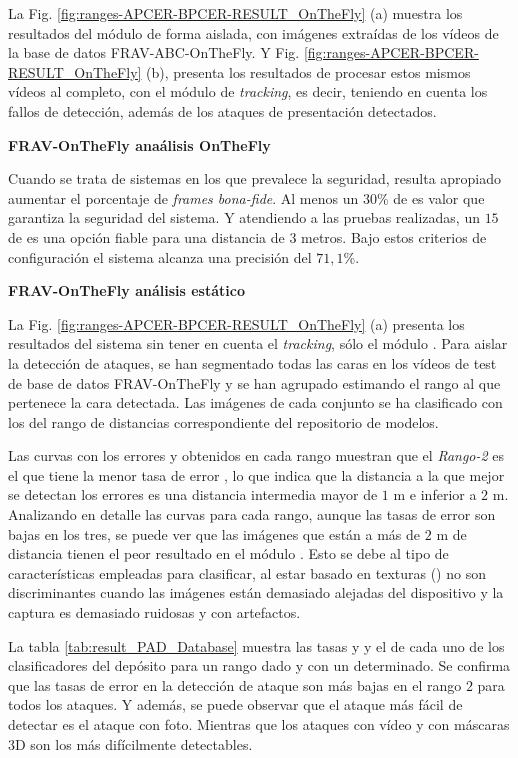 La Fig. \ref{fig:ranges-APCER-BPCER-RESULT_OnTheFly} (a) muestra los resultados del módulo  de forma aislada, con imágenes extraídas de los vídeos de la base de datos \Gls{FRAV-ABC-OnTheFly}. Y Fig. \ref{fig:ranges-APCER-BPCER-RESULT_OnTheFly} (b), presenta los resultados de procesar estos mismos vídeos al completo, con el módulo de \textit{tracking}, es decir, teniendo en cuenta los fallos de detección, además de los ataques de presentación detectados.

\medskip
\textbf{\Gls{FRAV-OnTheFly} anaálisis \gls{OnTheFly}} %
\medskip

Cuando se trata de sistemas  en los que prevalece la seguridad, resulta apropiado aumentar el porcentaje de \textit{frames bona-fide}. Al menos un $30$\% de  es valor que garantiza la seguridad del sistema. Y atendiendo a las pruebas realizadas, un $15$ de  es una opción fiable para una distancia de $3$ metros. Bajo estos criterios de configuración el sistema alcanza una precisión del $71,1$\%.


\medskip
\textbf{\Gls{FRAV-OnTheFly} análisis estático} %
\medskip

La Fig. \ref{fig:ranges-APCER-BPCER-RESULT_OnTheFly} (a) presenta los resultados del sistema sin tener en cuenta el \textit{tracking}, sólo el módulo . Para aislar la detección de ataques, se han segmentado todas las caras en los vídeos de test de base de datos \Gls{FRAV-OnTheFly} y se han agrupado estimando el rango al que pertenece la cara detectada. Las imágenes de cada conjunto se ha clasificado con los  del rango de distancias correspondiente del repositorio de modelos.

Las curvas  con los errores  y  obtenidos en cada rango muestran que el \textit{Rango-2} es el que tiene la menor tasa de error , lo que indica que la distancia a la que mejor se detectan los errores es una distancia intermedia mayor de $1$ m e inferior a $2$ m. Analizando en detalle las curvas para cada rango, aunque las tasas de error son bajas en los tres, se puede ver que las imágenes que están a más de $2$ m de distancia tienen el peor resultado en el módulo . Esto se debe al tipo de características empleadas para clasificar, al estar basado en texturas () no son discriminantes cuando las imágenes están demasiado alejadas del dispositivo y la captura es demasiado ruidosas y con artefactos.

La tabla \ref{tab:result_PAD_Database} muestra las tasas  y  y el  de cada uno de los clasificadores del depósito para un rango dado y con un  determinado. Se confirma que las tasas de error en la detección de ataque son más bajas en el rango $2$ para todos los ataques. Y además, se puede observar que el ataque más fácil de detectar es el ataque con foto. Mientras que los ataques con vídeo y con máscaras $3$D son los más difícilmente detectables.
\medskip

